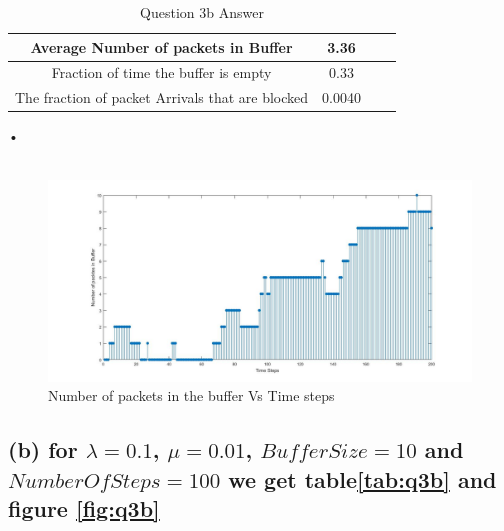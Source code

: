 \documentclass[a4paper,11pt]{article}
\begin{document}
\begin{table}
\centering
\begin{tabular}{ |c|c|c|c| } 
\hline
 Average Number of packets in Buffer& 3.36  \\
 \hline
 Fraction of time the buffer is empty& 0.33 \\
 \hline
 The fraction of packet Arrivals that are blocked& 0.0040\\
\hline
\end{tabular}
\caption{Question 3b Answer } \label{tab:q3a}
\end{table}•\\\\
\begin{figure}[h]
   \hspace*{-6cm}
    \includegraphics[scale=0.5]{q3_1}
    \caption{Number of packets in the buffer Vs Time steps}\label{fig:q3_a}
\end{figure}
\subsection*{(b) for $\lambda = 0.1$, $\mu=0.01$, $BufferSize=10$ and $NumberOf Steps=100$ we get table\ref{tab:q3b} and figure \ref{fig:q3b} }
\end{document}
